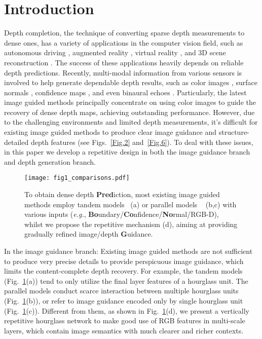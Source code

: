\documentclass[runningheads]{llncs}
\begin{document}
\section{Introduction}
Depth completion, the technique of converting sparse depth measurements to dense ones, has a variety of applications in the computer vision field, such as autonomous driving \cite{hane20173d,cui2019real,wang2021regularizing}, augmented reality \cite{dey2012tablet,song2020channel}, virtual reality \cite{armbruster2008depth}, and 3D scene reconstruction \cite{zhang2019pattern,park2020nonlocal,shen2021distortion,shen2022panoformer}. The success of these applications heavily depends on reliable depth predictions. Recently, multi-modal information from various sensors is involved to help generate dependable depth results, such as color images \cite{ma2018self,chen2019learning}, surface normals \cite{zhang2019pattern,Qiu_2019_CVPR}, confidence maps \cite{2020Confidence,vangansbeke2019}, and even binaural echoes \cite{gao2020visualechoes,parida2021beyond}. Particularly, the latest image guided methods \cite{zhao2021adaptive,liu2021fcfr,hu2020PENet,tang2020learning} principally concentrate on using color images to guide the recovery of dense depth maps, achieving outstanding performance. However, due to the challenging environments and limited depth measurements, it's difficult for existing image guided methods to produce clear image guidance and structure-detailed depth features (see Figs.~\ref{Fig.2} and~\ref{Fig.6}). To deal with these issues, in this paper we develop a repetitive design in both the image guidance branch and depth generation branch.

\begin{figure}[t]
\centering
\texttt{[image: fig1\_comparisons.pdf]}
\caption{To obtain dense depth \textbf{Pred}iction, most existing image guided methods employ tandem models~\cite{ma2018self,Cheng2020CSPN,park2020nonlocal} (a) or parallel models ~\cite{zhao2021adaptive,tang2020learning,liu2021fcfr,hu2020PENet} (b,c) with various inputs (\emph{e.g.}, \textbf{Bo}undary/\textbf{Co}nfidence/\textbf{No}rmal/RGB-D), whilst we propose the repetitive mechanism (d), aiming at providing gradually refined image/depth \textbf{G}uidance.
}\label{model_summary}
\end{figure}


In the image guidance branch: Existing image guided methods are not sufficient to produce very precise details to provide perspicuous image guidance, which limits the content-complete depth recovery. For example, the tandem models (Fig.~\ref{model_summary}(a)) tend to only utilize the final layer features of a hourglass unit. The parallel models conduct scarce interaction between multiple hourglass units (Fig.~\ref{model_summary}(b)), or refer to image guidance encoded only by single hourglass unit (Fig.~\ref{model_summary}(c)). Different from them, as shown in Fig.~\ref{model_summary}(d), we present a vertically repetitive hourglass network to make good use of RGB features in multi-scale layers, which contain image semantics with much clearer and richer contexts. 
\end{document}
